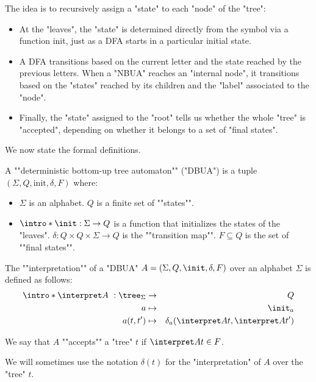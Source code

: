 \documentclass[a4paper,UKenglish,cleveref, autoref, thm-restate]{lipics-v2021}
\begin{document}
The idea is to recursively assign a "state" to each "node" of the "tree":
\begin{itemize}
	\item At the "leaves", the "state" is determined directly from the symbol via a function init, just as a DFA starts in a particular initial state.
	\item A DFA transitions based on the current letter and the state reached by the previous letters.
	      When a "NBUA" reaches an "internal node", it transitions based on the "states" reached by its children and the "label" associated to the "node".
	\item Finally, the "state" assigned to the "root" tells us whether the whole "tree" is "accepted",
	      depending on whether it belongs to a set of "final states".
\end{itemize}

We now state the formal definitions.

\begin{definition}
	\AP A ""deterministic bottom-up tree automaton"" (\reintro*"DBUA") is a tuple $(\Sigma, Q, \text{init}, \delta, F)$ where:
	\begin{itemize}
		\item $\Sigma$ is an alphabet.
		      \itemAP $Q$ is a finite set of ""states"".
		\item $\intro *\init : \Sigma \to Q$ is a function that initializes the states of the "leaves".
		      \itemAP $\delta : Q \times Q \times \Sigma \to Q$ is the ""transition map"".
		      \itemAP $F \subseteq Q$ is the set of ""final states"".
	\end{itemize}
\end{definition}

\begin{definition}
	\AP The ""interpretation"" of a "DBUA" $A = (\Sigma, Q, \init, \delta, F)$  over an alphabet $\Sigma$ is defined as follows:
	\begin{eqnarray*}
		\intro* \interpret A ~: \tree_{\Sigma} &\to& Q \\
		a &\mapsto& \init_a \\
		a(t,t') &\mapsto& \delta_a (\interpret A t, \interpret A {t'})
	\end{eqnarray*}

	We say that $A$ ""accepts"" a "tree" $t$ if $\interpret A t \in F$.

	We will sometimes use the notation $\delta(t)$ for the "interpretation" of $A$ over the "tree" $t$.
\end{definition}
\end{document}
